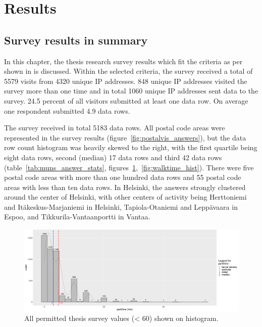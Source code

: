 \section{Results}
\subsection{Survey results in summary}
\justify

In this chapter, the thesis research survey results which fit the criteria as per shown in \hyperref[sec:processdata]{} is discussed. Within the selected criteria, the survey received a total of 5579 visits from 4320 unique IP addresses. 848 unique IP addresses visited the survey more than one time and in total 1060 unique IP addresses sent data to the survey. 24.5 percent of all visitors submitted at least one data row. On average one respondent submitted 4.9 data rows.

The survey received in total 5183 data rows. All postal code areas were represented in the survey results (figure~\ref{fig:postalvis_answers}), but the data row count histogram was heavily skewed to the right, with the first quartile being eight data rows, second (median) 17 data rows and third 42 data rows (table~\ref{tab:muns_answer_stats}, figures~\ref{fig:parktime_hist},~\ref{fig:walktime_hist}). There were five postal code areas with more than one hundred data rows and 55 postal code areas with less than ten data rows. In Helsinki, the answers strongly clustered around the center of Helsinki, with other centers of activity being Herttoniemi and Itäkeskus-Marjaniemi in Helsinki, Tapiola-Otaniemi and Leppävaara in Espoo, and Tikkurila-Vantaanportti in Vantaa.

\begin{figure}[H]%
    \centering
    \includegraphics[width=\textwidth]{images/hist_pmax59-wmax59_parktime-likert_binw2_02-08-2020.png}
    \caption[Histogram, searching for parking]{All permitted thesis survey  values (< 60) shown on histogram.}%
    \label{fig:parktime_hist}%
\end{figure}

